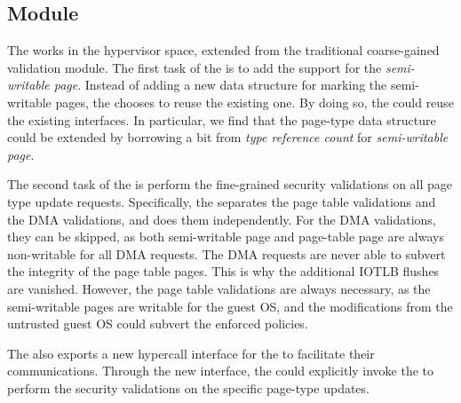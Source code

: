 \subsection{\name Module}\label{sec:module}
The \module works in the hypervisor space, extended from the traditional coarse-gained validation module.
The first task of the \module is to add the support for the \emph{semi-writable page}.
Instead of adding a new data structure for marking the semi-writable pages, the \module chooses to reuse the existing one.
By doing so, the \module could reuse the existing interfaces.
In particular, we find that the page-type data structure could be extended by borrowing a bit from \emph{type reference count} for \emph{semi-writable page}. 

The second task of the \module is perform the fine-grained security validations on all page type update requests.
Specifically, the \module separates the page table validations and the DMA validations, and does them independently.
For the DMA validations, they can be skipped, as both semi-writable page and page-table page are always non-writable for all DMA requests.
The DMA requests are never able to subvert the integrity of the page table pages.
This is why the additional IOTLB flushes are vanished.
However, the page table validations are always necessary, as the semi-writable pages are writable for the guest OS, and the modifications from the untrusted guest OS could subvert the enforced policies.

The \module also exports a new hypercall interface for the \cache to facilitate their communications.
Through the new interface, the \cache could explicitly invoke the \module to perform the security validations on the specific page-type updates.

